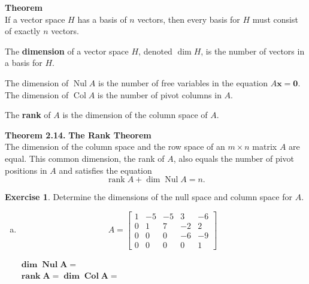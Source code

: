 \documentclass[10pt]{book}
\newcommand{\boxcolor}{gray!30}
\newenvironment{boxme}{\begin{mdframed}[backgroundcolor=\boxcolor,linewidth=0pt,nobreak=true]}{\end{mdframed}}
\newenvironment{boxthm}{\begin{mdframed}[backgroundcolor=\boxcolor,nobreak=true]}{\end{mdframed}}
\newenvironment{boxdef}{\begin{mdframed}[backgroundcolor=\boxcolor,linewidth=0pt,nobreak=true]}{\end{mdframed}}
\theoremstyle{definition}
\newtheorem{exercise}{Exercise}[section]
\newcommand{\vect}[1]{\ensuremath{\boldsymbol{\mathbf{#1}}}}
\DeclareMathOperator{\Nul}{Nul}
\DeclareMathOperator{\Col}{Col}
\DeclareMathOperator{\rank}{rank}
\newcommand{\Axz}{A\vect{x}=\vect{0}}
\begin{document}
\vfill

\begin{boxthm}
	\textbf{Theorem} \\
	If a vector space $H$ has a basis of $n$ vectors, then every basis for $H$ must consist of exactly $n$ vectors.
\end{boxthm}
\vspace{-1em}
\begin{boxdef}
	The \textbf{dimension} of a vector space $H$, denoted $\dim H$, is the number of vectors in a basis for $H$.
\end{boxdef}

\begin{boxme}
	The dimension of $\Nul A$ is the number of free variables in the equation $\Axz$. \\
	The dimension of $\Col A$ is the number of pivot columns in $A$.
\end{boxme}


\newpage

\begin{boxdef}
	The \textbf{rank} of $A$ is the dimension of the column space of $A$.
\end{boxdef}

\begin{boxthm}
	\textbf{Theorem 2.14.}
	\textbf{The Rank Theorem} \\
	The dimension of the column space and the row space of an $m\times n$ matrix $A$ are equal. This common dimension, the rank of $A$, also equals the number of pivot positions in $A$ and satisfies the equation
	\vspace{-1em}
	$$ \rank A + \dim\Nul A = n. $$
\end{boxthm}


\begin{exercise} %
	Determine the dimensions of the null space and column space for $A$.
	\begin{multicols}{2}
	\begin{enumerate}[(a)]
		\item $$A=\begin{bmatrix}1&-5&-5&3&-6\\0&1&7&-2&2\\0&0&0&-6&-9\\0&0&0&0&1\end{bmatrix}$$
		\vfill
		
		$\boldsymbol{\dim\Nul A=}$ \\[1em]
		$\boldsymbol{\rank A = \dim\Col A=}$

	\end{enumerate}
	\end{multicols}
\end{exercise}
\vfill
\end{document}
